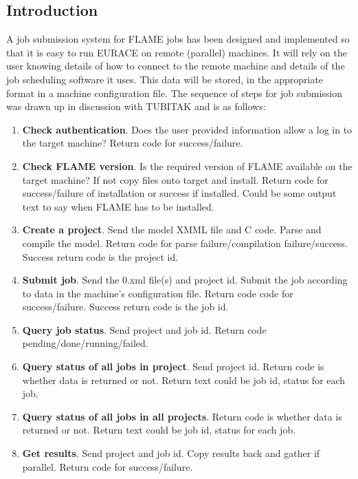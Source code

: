 \subsection{Introduction}

A job submission system for FLAME jobs has been designed and implemented  so that it is easy to run EURACE on remote (parallel) machines. It will rely on the user knowing details of how to connect to the remote machine and details of the job scheduling software it uses. This data will be stored, in the appropriate format in a machine configuration file. The sequence of steps for job submission was drawn up in discussion with TUBITAK and is as follows:

\begin{enumerate}
 \item \textbf{Check authentication}. Does the user provided information allow a log in to the target machine? Return code for success/failure.
    \item \textbf{Check FLAME version}. Is the required version of FLAME available on the target machine? If not copy files onto target and install. Return code for success/failure of installation or success if installed. Could be some output text to say when FLAME has to be installed.
    \item \textbf{Create a project}. Send the model XMML file and C code. Parse and compile the model. Return code for parse failure/compilation failure/success. Success return code is the project id.
    \item \textbf{Submit job}. Send the 0.xml file(s) and project id. Submit the job according to data in the machine's configuration file. Return code code for success/failure. Success return code is the job id.
    \item \textbf{Query job status}. Send project and job id. Return code pending/done/running/failed.
    \item \textbf{Query status of all jobs in project}. Send project id. Return code is whether data is returned or not. Return text could be {job id, status} for each job.
    \item \textbf{Query status of all jobs in all projects}. Return code is whether data is returned or not. Return text could be {job id, status} for each job.
    \item \textbf{Get results}. Send project and job id. Copy results back and gather if parallel. Return code for success/failure. 
\end{enumerate}

